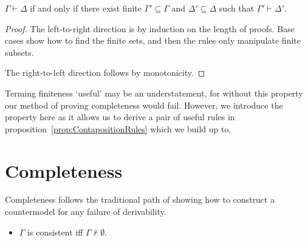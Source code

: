 \documentclass[10pt]{article}
\begin{document}
\begin{proposition}[Finiteness]\label{prop:finiteness}
  \(\Gamma \vdash \Delta\) if and only if there exist finite \(\Gamma' \subseteq \Gamma\) and \(\Delta' \subseteq \Delta\) such that \(\Gamma' \vdash \Delta'\).
  \begin{proof}
    The left-to-right direction is by induction on the length of proofs.
    Base cases show how to find the finite sets, and then the rules only manipulate finite subsets.

    The right-to-left direction follows by monotonicity.
  \end{proof}
\end{proposition}

Terming finiteness `useful' may be an understatement, for without this property our method of proving completeness would fail.
However, we introduce the property here as it allows us to derive a pair of useful rules in proposition~\ref{prop:ContapositionRules} which we build up to.


\newpage

\section{Completeness}
\label{sec:completeness-ideas}

Completeness follows the traditional path of showing how to construct a countermodel for any failure of derivability.

\begin{definition}[Consistency]
  \begin{itemize}
  \item \(\Gamma\) is consistent iff \(\Gamma \nvdash \emptyset\).
  \end{itemize}
\end{definition}
\end{document}
